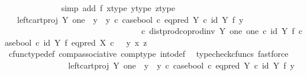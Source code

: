 \begin{isabellebody}
\ \ \ \ \ \ \ \ \ \ \ \ \isamarkupfalse%
\ {\isacharparenleft}{\kern0pt}simp\ add{\isacharcolon}{\kern0pt}\ f{}\ x{\isacharunderscore}{\kern0pt}type\ y{}{\isacharunderscore}{\kern0pt}type\ z{\isacharunderscore}{\kern0pt}type{\isacharparenright}{\kern0pt}\isanewline
\ \ \ \ \ \ \ \ \ \ \isamarkupfalse%
\ \isamarkupfalse%
\ {\isachardoublequoteopen}{\isachardot}{\kern0pt}{\isachardot}{\kern0pt}{\isachardot}{\kern0pt}\ {\isacharequal}{\kern0pt}\ {\isacharparenleft}{\kern0pt}left{\isacharunderscore}{\kern0pt}cart{\isacharunderscore}{\kern0pt}proj\ Y\ one\ {\isasymamalg}\ {\isacharparenleft}{\kern0pt}{\isacharparenleft}{\kern0pt}y{}\ {\isasymamalg}\ y{}{\isacharparenright}{\kern0pt}\ {\isasymcirc}\isactrlsub c\ case{\isacharunderscore}{\kern0pt}bool\ {\isasymcirc}\isactrlsub c\ eq{\isacharunderscore}{\kern0pt}pred\ Y\ {\isasymcirc}\isactrlsub c\ {\isacharparenleft}{\kern0pt}id\ Y\ {\isasymtimes}\isactrlsub f\ y{}{\isacharparenright}{\kern0pt}{\isacharparenright}{\kern0pt}{\isacharparenright}{\kern0pt}\isanewline
\ \ \ \ \ \ \ \ \ \ \ \ \ \ \ \ \ \ \ \ \ \ \ \ \ \ \ \ \ \ \ \ \ {\isasymcirc}\isactrlsub c\ dist{\isacharunderscore}{\kern0pt}prod{\isacharunderscore}{\kern0pt}coprod{\isacharunderscore}{\kern0pt}inv\ Y\ one\ one\ {\isasymcirc}\isactrlsub c\ {\isacharparenleft}{\kern0pt}id\ Y\ {\isasymtimes}\isactrlsub f\ case{\isacharunderscore}{\kern0pt}bool{\isacharparenright}{\kern0pt}\ {\isasymcirc}\isactrlsub c\ {\isacharparenleft}{\kern0pt}id\ Y\ {\isasymtimes}\isactrlsub f\ eq{\isacharunderscore}{\kern0pt}pred\ X{\isacharparenright}{\kern0pt}\ {\isasymcirc}\isactrlsub c\ \ \ {\isasymlangle}y{}{\isacharcomma}{\kern0pt}\ {\isasymlangle}x{\isacharcomma}{\kern0pt}\ z{\isasymrangle}{\isasymrangle}{\isachardoublequoteclose}\isanewline
\ \ \ \ \ \ \ \ \ \ \ \ \isamarkupfalse%
\ cfunc{\isacharunderscore}{\kern0pt}type{\isacharunderscore}{\kern0pt}def\ comp{\isacharunderscore}{\kern0pt}associative\ comp{\isacharunderscore}{\kern0pt}type\ into{\isacharunderscore}{\kern0pt}def\ \isamarkupfalse%
\ {\isacharparenleft}{\kern0pt}typecheck{\isacharunderscore}{\kern0pt}cfuncs{\isacharcomma}{\kern0pt}\ fastforce{\isacharparenright}{\kern0pt}\isanewline
\ \ \ \ \ \ \ \ \ \ \isamarkupfalse%
\ \isamarkupfalse%
\ {\isachardoublequoteopen}{\isachardot}{\kern0pt}{\isachardot}{\kern0pt}{\isachardot}{\kern0pt}\ {\isacharequal}{\kern0pt}\ {\isacharparenleft}{\kern0pt}left{\isacharunderscore}{\kern0pt}cart{\isacharunderscore}{\kern0pt}proj\ Y\ one\ {\isasymamalg}\ {\isacharparenleft}{\kern0pt}{\isacharparenleft}{\kern0pt}y{}\ {\isasymamalg}\ y{}{\isacharparenright}{\kern0pt}\ {\isasymcirc}\isactrlsub c\ case{\isacharunderscore}{\kern0pt}bool\ {\isasymcirc}\isactrlsub c\ eq{\isacharunderscore}{\kern0pt}pred\ Y\ {\isasymcirc}\isactrlsub c\ {\isacharparenleft}{\kern0pt}id\ Y\ {\isasymtimes}\isactrlsub f\ y{}{\isacharparenright}{\kern0pt}{\isacharparenright}{\kern0pt}{\isacharparenright}{\kern0pt}\isanewline

\end{isabellebody}
